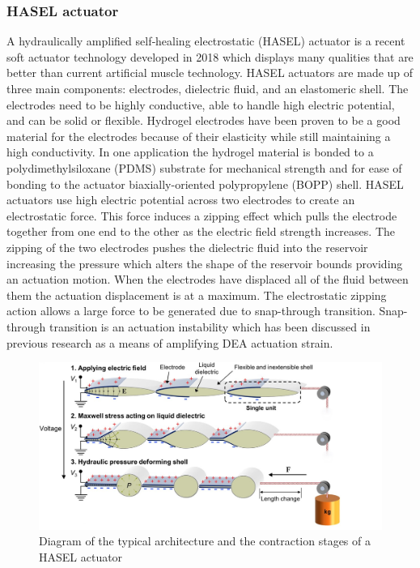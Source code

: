 \subsubsection{HASEL actuator}
A hydraulically amplified self‐healing electrostatic (HASEL) actuator is a recent soft actuator technology developed in 2018\citep{Kellaris2018} which displays many qualities that are better than current artificial muscle technology. HASEL actuators are made up of three main components: electrodes, dielectric fluid, and an elastomeric shell. The electrodes need to be highly conductive, able to handle high electric potential, and can be solid or flexible. Hydrogel electrodes have been proven to be a good material for the electrodes because of their elasticity while still maintaining a high conductivity\citep{Acome2018}. In one application the hydrogel material is bonded to a polydimethylsiloxane (PDMS) substrate for mechanical strength and for ease of bonding to the actuator biaxially-oriented polypropylene (BOPP) shell\citep{Kellaris2018,Yuk2016}. HASEL actuators use high electric potential across two electrodes to create an electrostatic force. This force induces a zipping effect which pulls the electrode together from one end to the other as the electric field strength increases. The zipping of the two electrodes pushes the dielectric fluid into the reservoir increasing the pressure which alters the shape of the reservoir bounds providing an actuation motion. When the electrodes have displaced all of the fluid between them the actuation displacement is at a maximum. The electrostatic zipping action allows a large force to be generated due to snap-through transition. Snap-through transition is an actuation instability which has been discussed in previous research as a means of amplifying DEA actuation strain\citep{Keplinger2012}. 
\begin{figure}[h!]
  \centering
  \includegraphics[width=0.7\linewidth]{Figures/HASEL_actuator_crop.jpg}
  \caption{Diagram of the typical architecture and the contraction stages of a HASEL actuator\citep{Kellaris2018}}
  \label{fig:Artificial Muscle_HASEL}
\end{figure}

